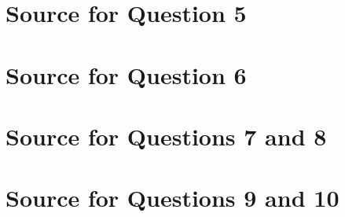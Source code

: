 \documentclass[letterpaper,11pt]{article}
\begin{document}
\clearpage
\appendix
\section{Source for Question 5}



\clearpage
\appendix
\section{Source for Question 6}



\clearpage
\appendix
\section{Source for Questions 7 and 8}



\clearpage
\appendix
\section{Source for Questions 9 and 10}



\clearpage


\end{document}

